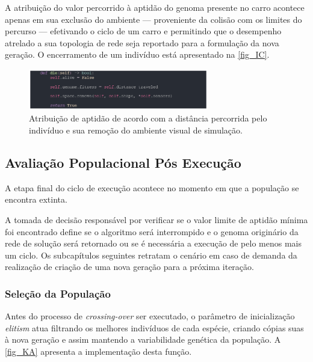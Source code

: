A atribuição do valor percorrido à aptidão do genoma presente no carro acontece apenas em sua exclusão do ambiente
— proveniente da colisão com os limites do percurso — efetivando o ciclo de um carro e permitindo que o desempenho atrelado a
sua topologia de rede seja reportado para a formulação da nova geração. O encerramento de um indivíduo está apresentado na \autoref{fig_IC}.

\begin{figure}[htb]
        \centering
        \caption{\label{fig_IC}Atribuição de aptidão de acordo com a distância percorrida pelo indivíduo e sua remoção do ambiente visual de simulação.}
        \includegraphics[width=0.7\textwidth]{images/IC.png}
\end{figure}

\subsection{Avaliação Populacional Pós Execução}
A etapa final do ciclo de execução acontece no momento em que a população se encontra extinta.

A tomada de decisão responsável por verificar se o valor limite de aptidão mínima foi encontrado
define se o algoritmo será interrompido e o genoma originário da rede de solução será retornado
ou se é necessária a execução de pelo menos mais um ciclo. Os subcapítulos seguintes retratam o cenário
em caso de demanda da realização de criação de uma nova geração para a próxima iteração.

\subsubsection{Seleção da População}
Antes do processo de \textit{crossing-over} ser executado, o parâmetro de inicialização
\textit{elitism} atua filtrando os melhores indivíduos de cada espécie, criando cópias suas
à nova geração e assim mantendo a variabilidade genética da população. A \autoref{fig_KA} apresenta a implementação desta função.

